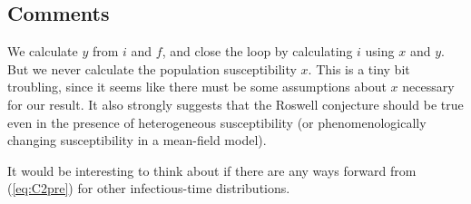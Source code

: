 \documentclass[12pt]{article}
\newcommand{\eqref}[1]{(\ref{eq:#1})}
\begin{document}
\subsection*{Comments}

We calculate $y$ from $i$ and $f$, and close the loop by calculating $i$ using $x$ and $y$. But we never calculate the population susceptibility $x$. This is a tiny bit troubling, since it seems like there must be some assumptions about $x$ necessary for our result. It also strongly suggests that the Roswell conjecture should be true even in the presence of heterogeneous susceptibility (or phenomenologically changing susceptibility in a mean-field model). 

It would be interesting to think about if there are any ways forward from \eqref{C2pre} for other infectious-time distributions.
\end{document}
